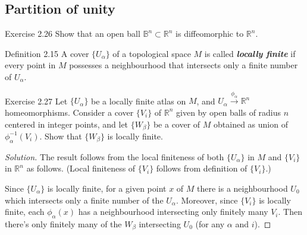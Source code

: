 \subsection{Partition of unity}

\begin{thing4}{Exercise 2.26}\label{exer:2.26}\leavevmode
Show that an open ball \(\mathbb{B}^n \subset \mathbb{R}^n\) is diffeomorphic to \(\mathbb{R}^n\).
\end{thing4}

\begin{thing4}{Definition 2.15}\label{def:2.15}\leavevmode
A cover \(\{U_\alpha\}\) of a topological space \(M\) is called \textit{\textbf{locally finite}} if every point in \(M\) possesses a neighbourhood that intersects only a finite number of \(U_\alpha\).
\end{thing4}

\begin{thing4}{Exercise 2.27}\label{exer:2.27}\leavevmode
Let \(\{U_\alpha\}\) be a locally finite atlas on \(M\), and \(U_\alpha\xrightarrow{\phi_\alpha}\mathbb{R}^n\) homeomorphisms. Consider a cover \(\{V_i\}\) of \( \mathbb{R}^n\) given by open balls of radius $n$ centered in integer points, and let \(\{ W_\beta\}\) be a cover of \(M\) obtained as union of \(\phi^{-1}_\alpha(V_i)\). Show that \(\{W_\beta\}\) is locally finite.
\end{thing4}

\begin{proof}[Solution]\leavevmode
 The result follows from the local finiteness of both \(\{U_\alpha\}\) in \(M\) and \(\{V_i\}\) in \(\mathbb{R}^n\) as follows. (Local finiteness of \(\{V_i\}\) follows from definition of \(\{V_i\}\).)

Since \(\{U_\alpha\}\) is locally finite, for a given point $x$ of \(M\) there is a neighbourhood \(U_0\) which intersects only a finite number of the \(U_\alpha\). Moreover, since  \(\{V_i\}\) is locally finite, each \(\phi_\alpha(x)\) has a neighbourhood intersecting only finitely many \(V_i\). Then there's only finitely many of the \(W_\beta\) intersecting \(U_0\) (for any \(\alpha\) and \(i\)).

\end{proof}

